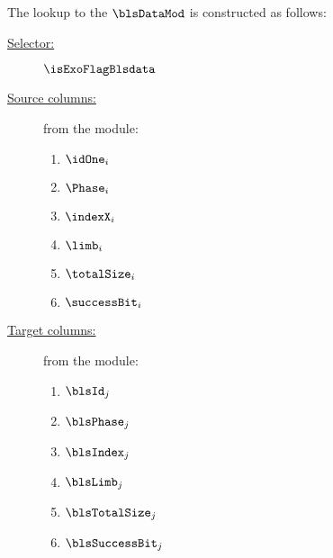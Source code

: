 The lookup to the $\blsDataMod$ is constructed as follows:
\begin{description}
	\item[\underline{Selector:}] $\isExoFlagBlsdata$
	\item[\underline{Source columns:}] from the \mmioMod{} module:
		\begin{multicols}{3}
			\begin{enumerate}
				\item $\idOne      _{i}$
				\item $\Phase      _{i}$
				\item $\indexX     _{i}$
				\item $\limb       _{i}$
				\item $\totalSize  _{i}$
				\item $\successBit _{i}$
			\end{enumerate}
		\end{multicols}
	\item[\underline{Target columns:}] from the \blsDataMod{} module: 
		\begin{multicols}{3}
			\begin{enumerate}
				\item $\blsId         _{j}$
				\item $\blsPhase      _{j}$
				\item $\blsIndex      _{j}$
				\item $\blsLimb       _{j}$
				\item $\blsTotalSize  _{j}$
				\item $\blsSuccessBit _{j}$
			\end{enumerate}
		\end{multicols}
\end{description}
